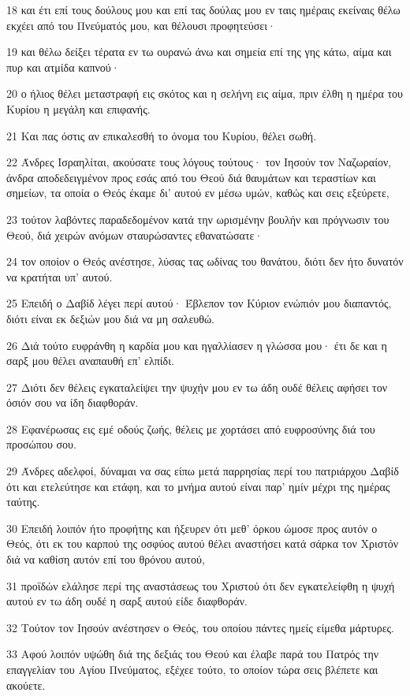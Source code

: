 \par 18 και έτι επί τους δούλους μου και επί τας δούλας μου εν ταις ημέραις εκείναις θέλω εκχέει από του Πνεύματός μου, και θέλουσι προφητεύσει·
\par 19 και θέλω δείξει τέρατα εν τω ουρανώ άνω και σημεία επί της γης κάτω, αίμα και πυρ και ατμίδα καπνού·
\par 20 ο ήλιος θέλει μεταστραφή εις σκότος και η σελήνη εις αίμα, πριν έλθη η ημέρα του Κυρίου η μεγάλη και επιφανής.
\par 21 Και πας όστις αν επικαλεσθή το όνομα του Κυρίου, θέλει σωθή.
\par 22 Άνδρες Ισραηλίται, ακούσατε τους λόγους τούτους· τον Ιησούν τον Ναζωραίον, άνδρα αποδεδειγμένον προς εσάς από του Θεού διά θαυμάτων και τεραστίων και σημείων, τα οποία ο Θεός έκαμε δι' αυτού εν μέσω υμών, καθώς και σεις εξεύρετε,
\par 23 τούτον λαβόντες παραδεδομένον κατά την ωρισμένην βουλήν και πρόγνωσιν του Θεού, διά χειρών ανόμων σταυρώσαντες εθανατώσατε·
\par 24 τον οποίον ο Θεός ανέστησε, λύσας τας ωδίνας του θανάτου, διότι δεν ήτο δυνατόν να κρατήται υπ' αυτού.
\par 25 Επειδή ο Δαβίδ λέγει περί αυτού· Έβλεπον τον Κύριον ενώπιόν μου διαπαντός, διότι είναι εκ δεξιών μου διά να μη σαλευθώ.
\par 26 Διά τούτο ευφράνθη η καρδία μου και ηγαλλίασεν η γλώσσα μου· έτι δε και η σαρξ μου θέλει αναπαυθή επ' ελπίδι.
\par 27 Διότι δεν θέλεις εγκαταλείψει την ψυχήν μου εν τω άδη ουδέ θέλεις αφήσει τον όσιόν σου να ίδη διαφθοράν.
\par 28 Εφανέρωσας εις εμέ οδούς ζωής, θέλεις με χορτάσει από ευφροσύνης διά του προσώπου σου.
\par 29 Άνδρες αδελφοί, δύναμαι να σας είπω μετά παρρησίας περί του πατριάρχου Δαβίδ ότι και ετελεύτησε και ετάφη, και το μνήμα αυτού είναι παρ' ημίν μέχρι της ημέρας ταύτης.
\par 30 Επειδή λοιπόν ήτο προφήτης και ήξευρεν ότι μεθ' όρκου ώμοσε προς αυτόν ο Θεός, ότι εκ του καρπού της οσφύος αυτού θέλει αναστήσει κατά σάρκα τον Χριστόν διά να καθίση αυτόν επί του θρόνου αυτού,
\par 31 προϊδών ελάλησε περί της αναστάσεως του Χριστού ότι δεν εγκατελείφθη η ψυχή αυτού εν τω άδη ουδέ η σαρξ αυτού είδε διαφθοράν.
\par 32 Τούτον τον Ιησούν ανέστησεν ο Θεός, του οποίου πάντες ημείς είμεθα μάρτυρες.
\par 33 Αφού λοιπόν υψώθη διά της δεξιάς του Θεού και έλαβε παρά του Πατρός την επαγγελίαν του Αγίου Πνεύματος, εξέχεε τούτο, το οποίον τώρα σεις βλέπετε και ακούετε.
